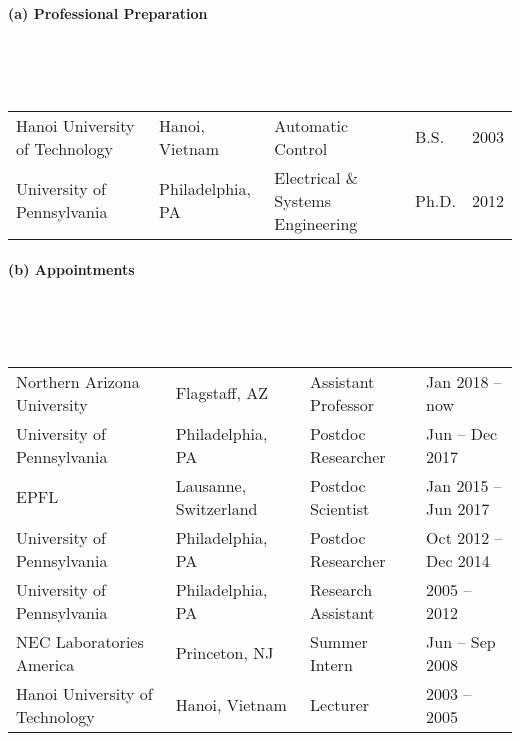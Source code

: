 \documentclass[11pt]{article}
\begin{document}

\paragraph{(a) Professional Preparation} ~

~

\noindent
\begin{tabular}{lllll}
  Hanoi University of Technology & Hanoi, Vietnam & Automatic Control & B.S. & 2003 \\[3pt]
  University of Pennsylvania & Philadelphia, PA & Electrical \& Systems Engineering & Ph.D. & 2012 \\[3pt]
\end{tabular} 





\paragraph{(b) Appointments} ~

~

\noindent
\begin{tabular}{llll}
  Northern Arizona University & Flagstaff, AZ    & Assistant Professor            & Jan 2018 -- now      \\[3pt]
  University of Pennsylvania & Philadelphia, PA & Postdoc Researcher & Jun -- Dec 2017 \\[3pt]
  EPFL & Lausanne, Switzerland & Postdoc Scientist & Jan 2015 -- Jun 2017 \\[3pt]
  University of Pennsylvania & Philadelphia, PA & Postdoc Researcher & Oct 2012 -- Dec 2014 \\[3pt]
  University of Pennsylvania & Philadelphia, PA & Research Assistant &  2005 -- 2012 \\[3pt]
  NEC Laboratories America & Princeton, NJ & Summer  Intern & Jun -- Sep 2008 \\[3pt]
  Hanoi University of Technology & Hanoi, Vietnam & Lecturer & 2003 -- 2005
\end{tabular}
\end{document}
